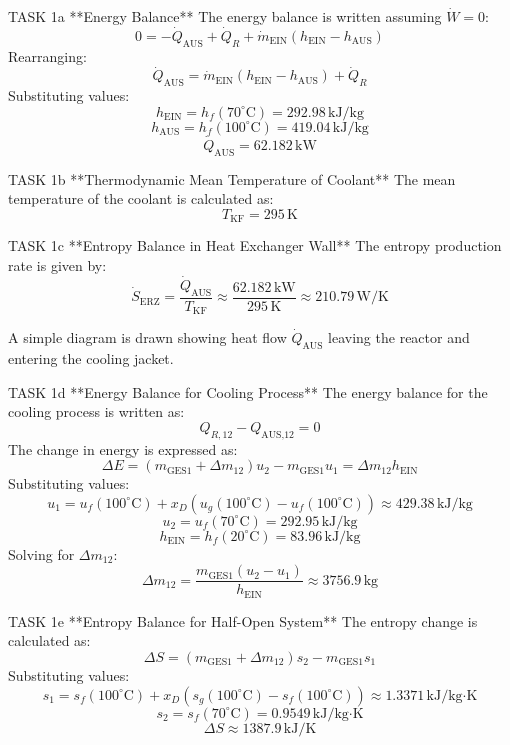 TASK 1a  
**Energy Balance**  
The energy balance is written assuming \( \dot{W} = 0 \):  
\[
0 = -\dot{Q}_{\text{AUS}} + \dot{Q}_R + \dot{m}_{\text{EIN}} \left( h_{\text{EIN}} - h_{\text{AUS}} \right)
\]  
Rearranging:  
\[
\dot{Q}_{\text{AUS}} = \dot{m}_{\text{EIN}} \left( h_{\text{EIN}} - h_{\text{AUS}} \right) + \dot{Q}_R
\]  
Substituting values:  
\[
h_{\text{EIN}} = h_f(70^\circ\text{C}) = 292.98 \, \text{kJ/kg}
\]  
\[
h_{\text{AUS}} = h_f(100^\circ\text{C}) = 419.04 \, \text{kJ/kg}
\]  
\[
\dot{Q}_{\text{AUS}} = 62.182 \, \text{kW}
\]  

TASK 1b  
**Thermodynamic Mean Temperature of Coolant**  
The mean temperature of the coolant is calculated as:  
\[
T_{\text{KF}} = 295 \, \text{K}
\]  

TASK 1c  
**Entropy Balance in Heat Exchanger Wall**  
The entropy production rate is given by:  
\[
\dot{S}_{\text{ERZ}} = \frac{\dot{Q}_{\text{AUS}}}{T_{\text{KF}}} \approx \frac{62.182 \, \text{kW}}{295 \, \text{K}} \approx 210.79 \, \text{W/K}
\]  

A simple diagram is drawn showing heat flow \( \dot{Q}_{\text{AUS}} \) leaving the reactor and entering the cooling jacket.  

TASK 1d  
**Energy Balance for Cooling Process**  
The energy balance for the cooling process is written as:  
\[
Q_{R,12} - Q_{\text{AUS,12}} = 0
\]  
The change in energy is expressed as:  
\[
\Delta E = \left( m_{\text{GES1}} + \Delta m_{12} \right) u_2 - m_{\text{GES1}} u_1 = \Delta m_{12} h_{\text{EIN}}
\]  
Substituting values:  
\[
u_1 = u_f(100^\circ\text{C}) + x_D \left( u_g(100^\circ\text{C}) - u_f(100^\circ\text{C}) \right) \approx 429.38 \, \text{kJ/kg}
\]  
\[
u_2 = u_f(70^\circ\text{C}) = 292.95 \, \text{kJ/kg}
\]  
\[
h_{\text{EIN}} = h_f(20^\circ\text{C}) = 83.96 \, \text{kJ/kg}
\]  
Solving for \( \Delta m_{12} \):  
\[
\Delta m_{12} = \frac{m_{\text{GES1}} \left( u_2 - u_1 \right)}{h_{\text{EIN}}} \approx 3756.9 \, \text{kg}
\]  

TASK 1e  
**Entropy Balance for Half-Open System**  
The entropy change is calculated as:  
\[
\Delta S = \left( m_{\text{GES1}} + \Delta m_{12} \right) s_2 - m_{\text{GES1}} s_1
\]  
Substituting values:  
\[
s_1 = s_f(100^\circ\text{C}) + x_D \left( s_g(100^\circ\text{C}) - s_f(100^\circ\text{C}) \right) \approx 1.3371 \, \text{kJ/kg·K}
\]  
\[
s_2 = s_f(70^\circ\text{C}) = 0.9549 \, \text{kJ/kg·K}
\]  
\[
\Delta S \approx 1387.9 \, \text{kJ/K}
\]